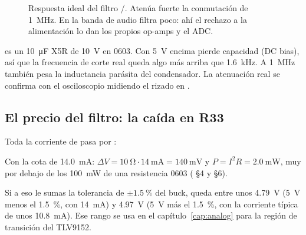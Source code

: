 \begin{figure}[htbp]
\centering
{}
\caption{Respuesta ideal del filtro /. Atenúa fuerte la conmutación de \SI{1}{\mega\hertz}. En la banda de audio filtra poco: ahí el rechazo a la alimentación lo dan los propios op-amps y el ADC.}
\label{fig:c02-bode}
\end{figure}

\begin{ojo}
 es un \SI{10}{\micro\farad} X5R de \SI{10}{\volt} en 0603. Con \SI{5}{\volt} encima pierde capacidad (DC bias), así que la frecuencia de corte real queda algo más arriba que \SI{1.6}{\kilo\hertz}. A \SI{1}{\mega\hertz} también pesa la inductancia parásita del condensador. La atenuación real se confirma con el osciloscopio midiendo el rizado en  \medir.
\end{ojo}

\subsection*{El precio del filtro: la caída en R33}

Toda la corriente de  pasa por :

\begin{calculo}
Con la cota de \SI{14.0}{\milli\ampere}: $\Delta V = \SI{10}{\ohm}\cdot\SI{14}{\milli\ampere} = \SI{140}{\milli\volt}$ y $P = I^2R = \SI{2.0}{\milli\watt}$, muy por debajo de los \SI{100}{\milli\watt} de una resistencia 0603 ( §4 y §6).

Si a eso le sumas la tolerancia de $\pm\SI{1.5}{\percent}$ del buck,  queda entre unos \SI{4.79}{\volt} (\SI{5}{\volt} menos el \SI{1.5}{\percent}, con \SI{14}{\milli\ampere}) y \SI{4.97}{\volt} (\SI{5}{\volt} más el \SI{1.5}{\percent}, con la corriente típica de unos \SI{10.8}{\milli\ampere}). Ese rango se usa en el capítulo~\ref{cap:analog} para la región de transición del TLV9152.
\end{calculo}

